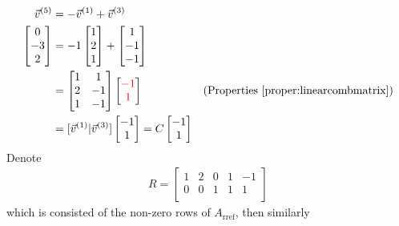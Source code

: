 \begin{align*}
\vec{v}^{(5)} &= -\vec{v}^{(1)} + \vec{v}^{(3)} \\
\begin{bmatrix}
0 \\
-3 \\
2
\end{bmatrix}
&= -1 
\begin{bmatrix}
1 \\
2 \\
1
\end{bmatrix}
+
\begin{bmatrix}
1 \\
-1 \\
-1
\end{bmatrix} \\
&=
\begin{bmatrix}
1 & 1 \\
2 & -1 \\
1 & -1
\end{bmatrix}
\begin{bmatrix}
\textcolor{red}{-1} \\
\textcolor{red}{1}
\end{bmatrix} & \text{(Properties \ref{proper:linearcombmatrix})} \\
&= [\vec{v}^{(1)}|\vec{v}^{(3)}]\begin{bmatrix}
-1 \\
1
\end{bmatrix} = C \begin{bmatrix}
-1 \\
1
\end{bmatrix}
\end{align*}
Denote
\begin{align*}
R = \begin{bmatrix}
1 & 2 & 0 & 1 & -1 \\
0 & 0 & 1 & 1 & 1 \\
\end{bmatrix}
\end{align*}
which is consisted of the non-zero rows of $A_{\text{rref}}$, then similarly
